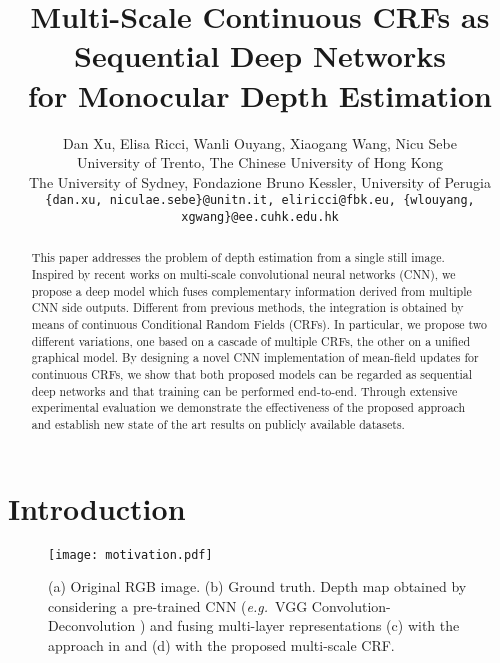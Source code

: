 \documentclass[10pt,twocolumn,letterpaper]{article}
\def\eg{\textit{e.g.}~}
\begin{document}
\title{Multi-Scale Continuous CRFs as Sequential Deep Networks \\for Monocular Depth Estimation}

\author{Dan Xu, Elisa Ricci, Wanli Ouyang, Xiaogang Wang, Nicu Sebe\\
University of Trento, The Chinese University of Hong Kong\\
The University of Sydney, Fondazione Bruno Kessler, University of Perugia\\
{\tt\small \{dan.xu, niculae.sebe\}@unitn.it, eliricci@fbk.eu, \{wlouyang, xgwang\}@ee.cuhk.edu.hk}  
}

\maketitle
\newcommand\figcaption{\def\@captype{figure}\caption} 
  \newcommand\tabcaption{\def\@captype{table}\caption} 



\begin{abstract}
This paper addresses the problem of depth estimation from a single still image.
Inspired by recent works on multi-scale convolutional neural networks (CNN), we propose a 
deep model which fuses complementary information derived from multiple CNN side outputs.
Different from previous methods, the integration is obtained by means of 
continuous Conditional Random Fields (CRFs). In particular, we propose {two different variations}, 
one based on a cascade of multiple CRFs, the other on a unified graphical model. By designing a novel CNN
implementation of mean-field updates for continuous CRFs, we show that both proposed models
can be regarded as sequential deep networks and that 
training can be performed end-to-end. Through extensive experimental evaluation we demonstrate the effectiveness of the proposed approach 
and establish new state of the art results on publicly available datasets. 
\end{abstract}

\section{Introduction}
\begin{figure}[t]
\centering
\texttt{[image: motivation.pdf]}
\caption{(a) Original RGB image. (b) Ground truth. Depth map obtained by considering a pre-trained CNN (\eg VGG 
Convolution-Deconvolution \cite{noh2015learning})
and fusing multi-layer representations (c) with the approach in
\cite{xie2015holistically} and (d) with the proposed multi-scale CRF. }
\label{motivation}
\vspace{-0.5cm}
\end{figure}
\end{document}
